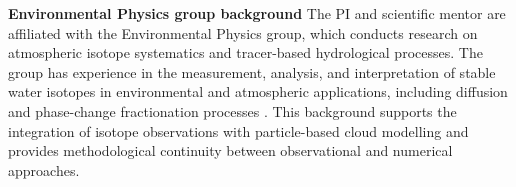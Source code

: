 \documentclass[12pt]{article}
\begin{document}
\noindent\textbf{Environmental Physics group background}
The PI and scientific mentor are affiliated with the
Environmental Physics group, which conducts research on atmospheric
isotope systematics and tracer-based hydrological processes.
The group has experience in the measurement, analysis,
and interpretation of stable water isotopes in environmental
and atmospheric applications, including diffusion and phase-change
fractionation processes \parencite{2022_Pierchala_EtAl}.
This background supports the integration of isotope observations
with particle-based cloud modelling and provides methodological 
continuity between observational and numerical approaches.

\appendix

\clearpage
{}
\printbibliography
\end{document}

